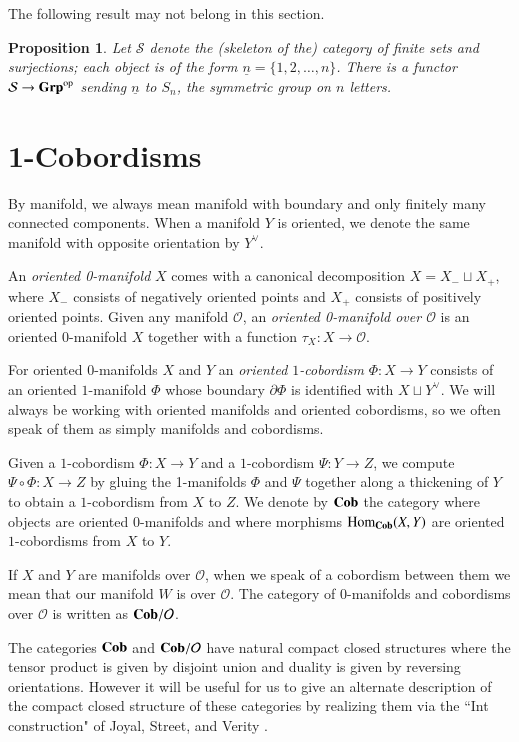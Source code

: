 \documentclass{amsart}
\def\tn{\textnormal}
\def\mc{\mathcal}
\def\Hom{\tn{Hom}}
\def\to{\rightarrow}
\def\taking{\colon}
\def\op{^\tn{op}}
\def\ul{\underline}
\def\Cob{{\bf Cob}}
\def\Grp{{\bf Grp}}
\def\mcO{\mc{O}}
\def\mcS{\mc{S}}
\newcommand{\inp}[1]{{#1_-}}
\newcommand{\outp}[1]{{#1_+}}
\newtheorem{proposition}[subsection]{Proposition}
\theoremstyle{remark}
\theoremstyle{definition}
\begin{document}
The following result may not belong in this section.

\begin{proposition}

Let $\mcS$ denote the (skeleton of the) category of finite sets and surjections; each object is of the form $\ul{n}=\{1,2,\ldots,n\}$. There is a functor $\mcS\to\Grp\op$ sending $\ul{n}$ to $S_n$, the symmetric group on $n$ letters.

\end{proposition}


\section{1-Cobordisms}

By manifold, we always mean manifold with boundary and only finitely many connected components.  When a manifold $Y$ is oriented, we denote the same manifold with opposite orientation by $Y^\vee$.

An {\em oriented 0-manifold} $X$ comes with a canonical decomposition $X=\inp{X}\sqcup\outp{X}$, where $\inp{X}$ consists of negatively oriented points and $\outp{X}$ consists of positively oriented points.  Given any manifold $\mcO$, an {\em oriented 0-manifold over $\mcO$} is an oriented $0$-manifold $X$ together with a function $\tau_X\taking X\to\mcO$. 

For oriented $0$-manifolds $X$ and $Y$ an {\em oriented $1$-cobordism} $\Phi:X\to Y$ consists of an oriented $1$-manifold $\Phi$ whose boundary $\partial \Phi$ is identified with $X\sqcup Y^\vee$. We will always be working with oriented manifolds and oriented cobordisms, so we often speak of them as simply manifolds and cobordisms. 

Given a $1$-cobordism $\Phi:X\to Y$ and a $1$-cobordism $\Psi:Y\to Z$, we compute $\Psi\circ\Phi:X\to Z$ by gluing the 1-manifolds $\Phi$ and $\Psi$ together along a thickening of $Y$ to obtain a $1$-cobordism from $X$ to $Z$. We denote by $\Cob$ the category where objects are oriented $0$-manifolds and where morphisms $\Hom_\Cob(X,Y)$ are oriented $1$-cobordisms from $X$ to $Y$.  

If $X$ and $Y$ are manifolds over $\mcO$, when we speak of a cobordism between them we mean that our manifold $W$ is over $\mcO$.  The category of 0-manifolds and cobordisms over $\mcO$ is written as $\Cob/\mcO$.

The categories $\Cob$ and $\Cob/\mcO$ have natural compact closed structures where the tensor product is given by disjoint union and duality is given by reversing orientations.  However it will be useful for us to give an alternate description of the compact closed structure of these categories by realizing them via the ``Int construction" of Joyal, Street, and Verity \cite{joyal-street-verity}.
\end{document}
